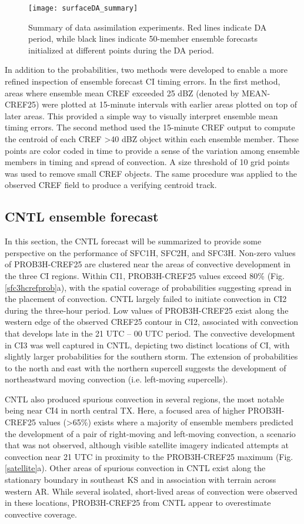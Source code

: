 \begin{figure}
\centering
\texttt{[image: surfaceDA\_summary]}
\caption{Summary of data assimilation experiments. Red lines indicate DA period, while black lines indicate 50-member ensemble forecasts initialized at different points during the DA period.}
\label{sfcsummary}
\end{figure}

In addition to the probabilities, two methods were developed to enable a more refined inspection of ensemble forecast CI timing errors. In the first method, areas where ensemble mean CREF exceeded 25 dBZ (denoted by MEAN-CREF25) were plotted at 15-minute intervals with earlier areas plotted on top of later areas. This provided a simple way to visually interpret ensemble mean timing errors. The second method used the 15-minute CREF output to compute the centroid of each CREF \textgreater 40 dBZ object within each ensemble member. These points are color coded in time to provide a sense of the variation among ensemble members in timing and spread of convection. A size threshold of 10 grid points was used to remove small CREF objects. The same procedure was applied to the observed CREF field to produce a verifying centroid track.

\subsection{CNTL ensemble forecast}
In this section, the CNTL forecast will be summarized to provide some perspective on the performance of SFC1H, SFC2H, and SFC3H. Non-zero values of PROB3H-CREF25 are clustered near the areas of convective development in the three CI regions. Within CI1, PROB3H-CREF25 values exceed 80\% (Fig. \ref{sfc3hcrefprob}a), with the spatial coverage of probabilities suggesting spread in the placement of convection. CNTL largely failed to initiate convection in CI2 during the three-hour period. Low values of PROB3H-CREF25 exist along the western edge of the observed CREF25 contour in CI2, associated with convection that develops late in the 21 UTC -- 00 UTC period. The convective development in CI3 was well captured in CNTL, depicting two distinct locations of CI, with slightly larger probabilities for the southern storm. The extension of probabilities to the north and east with the northern supercell suggests the development of northeastward moving convection (i.e. left-moving supercells).

CNTL also produced spurious convection in several regions, the most notable being near CI4 in north central TX. Here, a focused area of higher PROB3H-CREF25 values (\textgreater 65\%) exists where a majority of ensemble members predicted the development of a pair of right-moving and left-moving convection, a scenario that was not observed, although visible satellite imagery indicated attempts at convection near 21 UTC in proximity to the PROB3H-CREF25 maximum (Fig. \ref{satellite}a). Other areas of spurious convection in CNTL exist along the stationary boundary in southeast KS and in association with terrain across western AR. While several isolated, short-lived areas of convection were observed in these locations, PROB3H-CREF25 from CNTL appear to overestimate convective coverage.

